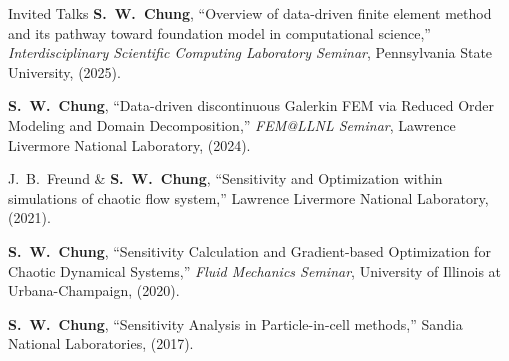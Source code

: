 \documentclass{resume} %
\begin{document}

\begin{rSection}{Invited Talks}
\textbf{S.\ W.\ Chung}, ``Overview of data-driven finite element method and its pathway toward foundation model in computational science,''
\textit{Interdisciplinary Scientific Computing Laboratory Seminar}, Pennsylvania State University, (2025).
\par
\textbf{S.\ W.\ Chung}, ``Data-driven discontinuous Galerkin FEM via Reduced Order Modeling and Domain Decomposition,''
\textit{FEM@LLNL Seminar}, Lawrence Livermore National Laboratory, (2024).
\par
J.\ B.\ Freund \& \textbf{S.\ W.\ Chung}, ``Sensitivity and Optimization within simulations of chaotic flow system,''
Lawrence Livermore National Laboratory, (2021).
\par
\textbf{S.\ W.\ Chung}, ``Sensitivity Calculation and Gradient-based Optimization for Chaotic Dynamical Systems,''
\textit{Fluid Mechanics Seminar}, University of Illinois at Urbana-Champaign, (2020).
\par
\textbf{S.\ W.\ Chung}, ``Sensitivity Analysis in Particle-in-cell methods,'' Sandia National Laboratories, (2017).
\end{rSection}
\end{document}
